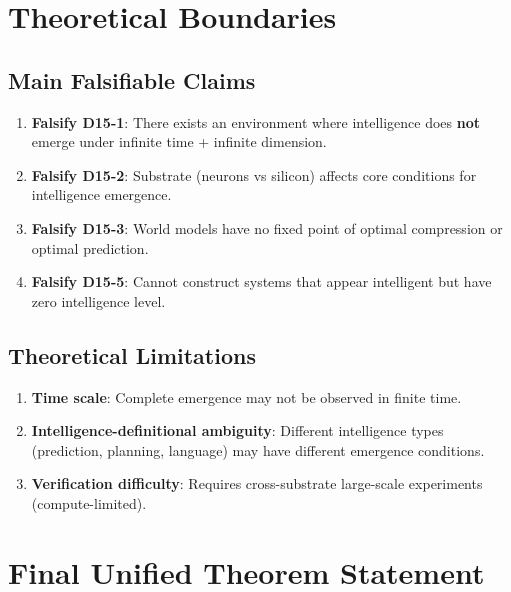 \documentclass[12pt, a4paper]{article}
\begin{document}
\section{Theoretical Boundaries}\label{sec:boundaries}

\subsection{Main Falsifiable Claims}

\begin{enumerate}
\item \textbf{Falsify D15-1}: There exists an environment where intelligence does \textbf{not} emerge under infinite time + infinite dimension.
\item \textbf{Falsify D15-2}: Substrate (neurons vs silicon) affects core conditions for intelligence emergence.
\item \textbf{Falsify D15-3}: World models have no fixed point of optimal compression or optimal prediction.
\item \textbf{Falsify D15-5}: Cannot construct systems that appear intelligent but have zero intelligence level.
\end{enumerate}

\subsection{Theoretical Limitations}

\begin{enumerate}
\item \textbf{Time scale}: Complete emergence may not be observed in finite time.
\item \textbf{Intelligence-definitional ambiguity}: Different intelligence types (prediction, planning, language) may have different emergence conditions.
\item \textbf{Verification difficulty}: Requires cross-substrate large-scale experiments (compute-limited).
\end{enumerate}

\section{Final Unified Theorem Statement}\label{sec:final}
\end{document}
